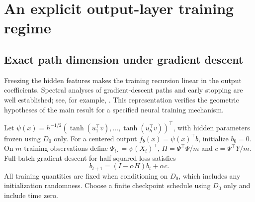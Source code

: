 \documentclass[pdflatex,sn-mathphys-ay]{sn-jnl}
\theoremstyle{remark}\newtheorem{remark}[theorem]{Remark}
\begin{document}
\section{An explicit output-layer training regime}\label{sec:outputregime}
\subsection{Exact path dimension under gradient descent}
Freezing the hidden features makes the training recursion linear in the output coefficients. Spectral analyses of gradient-descent paths and early stopping are well established; see, for example, \citet{raskutti}. This representation verifies the geometric hypotheses of the main result for a specified neural training mechanism.

Let $\psi(x)=h^{-1/2}(\tanh(u_1^\top v),\ldots,\tanh(u_h^\top v))^\top$, with hidden parameters frozen using $D_0$ only. For a centered output $f_b(x)=\psi(x)^\top b$, initialize $b_0=0$. On $m$ training observations define $\Psi_{i\cdot}=\psi(X_i)^\top$, $H=\Psi^\top\Psi/m$ and $c=\Psi^\top Y/m$. Full-batch gradient descent for half squared loss satisfies
\[
 b_{t+1}=(I-\alpha H)b_t+\alpha c.
\]
All training quantities are fixed when conditioning on $D_0$, which includes any initialization randomness. Choose a finite checkpoint schedule using $D_0$ only and include time zero.
\end{document}
